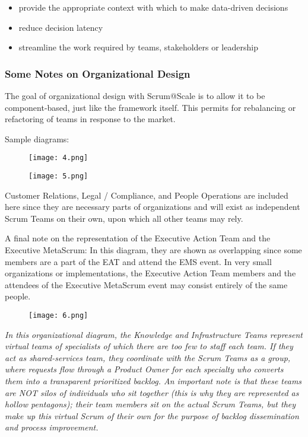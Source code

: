 \documentclass[12pt,a4paper,parskip=full]{scrartcl}
\begin{document}
\begin{itemize}
\itemsep1pt\parskip0pt
\item
  provide the appropriate context with which to make data-driven
  decisions
\item
  reduce decision latency
\item
  streamline the work required by teams, stakeholders or leadership
\end{itemize}

\subsubsection{Some Notes on Organizational
Design}\label{some-notes-on-organizational-design}

The goal of organizational design with Scrum@Scale is to allow it to be component-based, just like the framework itself. This permits for rebalancing or refactoring of teams in response to the market.

Sample diagrams:
\begin{figure}[H]
    \centering
    \texttt{[image: 4.png]}
\end{figure}


\begin{figure}[H]
    \centering
    \texttt{[image: 5.png]}
\end{figure}

Customer Relations, Legal / Compliance, and People Operations are included here since they are necessary parts of organizations and will exist as independent Scrum Teams on their own, upon which all other teams may rely.

A final note on the representation of the Executive Action Team and the Executive MetaScrum: In this diagram, they are shown as overlapping since some members are a part of the EAT and attend the EMS event. In very small organizations or implementations, the Executive
Action Team members and the attendees of the Executive MetaScrum event may consist entirely of the same people.

\begin{figure}[H]
    \centering
    \texttt{[image: 6.png]}
\end{figure}


\emph{In this organizational diagram, the Knowledge and Infrastructure Teams represent virtual teams of specialists of which there are too few to staff each team. If they act as shared-services team, they coordinate with the Scrum Teams as a group, where requests flow through a Product Owner for each specialty who converts them into a transparent prioritized backlog. An important note is that these teams are NOT silos of individuals who sit together (this is why they are represented as hollow pentagons); their team members sit on the actual Scrum Teams, but they make up this virtual Scrum of their own for the purpose of backlog dissemination and process improvement.}
\end{document}
